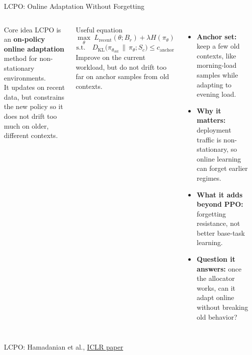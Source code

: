 \documentclass[10pt,aspectratio=169]{beamer}
\begin{document}
\begin{frame}{LCPO: Online Adaptation Without Forgetting}
  \begin{columns}[T,onlytextwidth]
      \begin{block}{Core idea}
        \scriptsize
        LCPO is an \textbf{on-policy online adaptation} method for non-stationary environments.\\[0.2em]
        It updates on recent data, but constrains the new policy so it does not drift too much on older, different contexts.
      \end{block}

      \begin{block}{Useful equation}
        \scriptsize
        \begin{equation*}
        \max_{\theta}\;
        L_{\mathrm{recent}}(\theta; B_r) + \lambda H(\pi_\theta)
        \end{equation*}
        \begin{equation*}
        \text{s.t.}\quad
        D_{\mathrm{KL}}\!\bigl(
        \pi_{\theta_{\mathrm{old}}} \,\|\, \pi_{\theta};
        S_c
        \bigr)
        \le c_{\mathrm{anchor}}
        \end{equation*}
        \scriptsize
        Improve on the current workload, but do not drift too far on anchor samples from old contexts.
      \end{block}
      \scriptsize
      \begin{itemize}
        \item \textbf{Anchor set:} keep a few old contexts, like morning-load samples while adapting to evening load.
        \item \textbf{Why it matters:} deployment traffic is non-stationary, so online learning can forget earlier regimes.
        \item \textbf{What it adds beyond PPO:} forgetting resistance, not better base-task learning.
        \item \textbf{Question it answers:} once the allocator works, can it adapt online without breaking old behavior?
      \end{itemize}
  \end{columns}

  \vspace{0.2em}
  {\tiny LCPO: Hamadanian et al., \href{https://lcpo.csail.mit.edu/content/lcpo-iclr.pdf}{ICLR paper}}
\end{frame}
\end{document}
